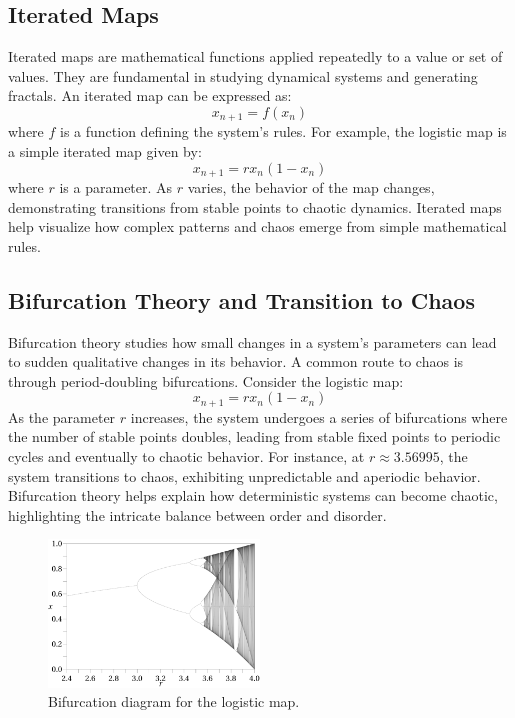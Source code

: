 \documentclass[12pt]{article}
\begin{document}
\subsection{Iterated Maps}
Iterated maps are mathematical functions applied repeatedly to a value or set of values. They are fundamental in studying dynamical systems and generating fractals. An iterated map can be expressed as:
\[
x_{n+1} = f(x_n)
\]
where \( f \) is a function defining the system's rules. For example, the logistic map is a simple iterated map given by:
\[
x_{n+1} = r x_n (1 - x_n)
\]
where \( r \) is a parameter. As \( r \) varies, the behavior of the map changes, demonstrating transitions from stable points to chaotic dynamics. Iterated maps help visualize how complex patterns and chaos emerge from simple mathematical rules.

\subsection{Bifurcation Theory and Transition to Chaos}
Bifurcation theory studies how small changes in a system's parameters can lead to sudden qualitative changes in its behavior. A common route to chaos is through period-doubling bifurcations. Consider the logistic map:
\[
x_{n+1} = r x_n (1 - x_n)
\]
As the parameter \( r \) increases, the system undergoes a series of bifurcations where the number of stable points doubles, leading from stable fixed points to periodic cycles and eventually to chaotic behavior. For instance, at \( r \approx 3.56995 \), the system transitions to chaos, exhibiting unpredictable and aperiodic behavior. Bifurcation theory helps explain how deterministic systems can become chaotic, highlighting the intricate balance between order and disorder.

\begin{figure}[h]
\centering
\includegraphics[width=0.5\textwidth]{assets/bifurcation.png}
\caption{Bifurcation diagram for the logistic map.}
\label{fig:bifurcation}
\end{figure}
\end{document}
